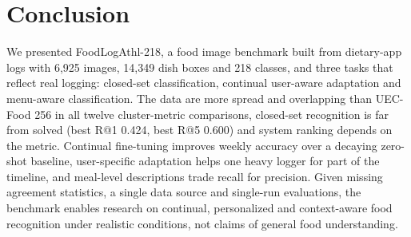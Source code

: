 \documentclass[sigconf, nonacm]{acmart}
\begin{document}
\section{Conclusion}
We presented FoodLogAthl-218, a food image benchmark built from dietary-app logs with 6,925 images, 14,349 dish boxes and 218 classes, and three tasks that reflect real logging: closed-set classification, continual user-aware adaptation and menu-aware classification. The data are more spread and overlapping than UEC-Food 256 in all twelve cluster-metric comparisons, closed-set recognition is far from solved (best R@1 0.424, best R@5 0.600) and system ranking depends on the metric. Continual fine-tuning improves weekly accuracy over a decaying zero-shot baseline, user-specific adaptation helps one heavy logger for part of the timeline, and meal-level descriptions trade recall for precision. Given missing agreement statistics, a single data source and single-run evaluations, the benchmark enables research on continual, personalized and context-aware food recognition under realistic conditions, not claims of general food understanding.




\end{document}
